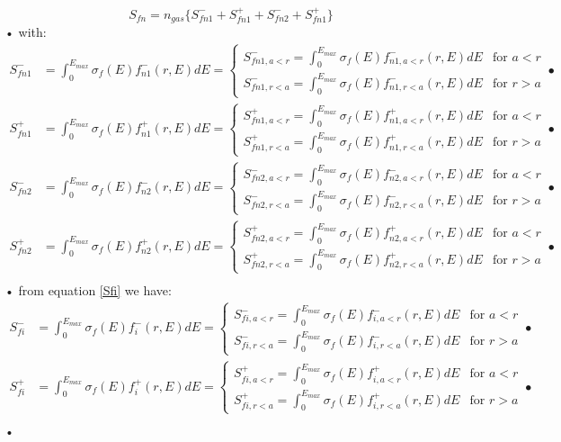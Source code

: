 \documentclass[a3]{book}
\begin{document}
\begin{equation}
 S_{fn} = n_{gas} \big\{ S_{fn1}^- + S_{fn1}^+ + S_{fn2}^- + S_{fn1}^+\big\}
\end{equation}•
with:
\begin{align}
 S_{fn1}^- 	& = \int_0^{E_{max}} \sigma_f(E) f_{n1}^-(r,E) dE =
	\begin{cases}
		S_{fn1,a<r}^- 	 = \int_0^{E_{max}} \sigma_f(E) f_{n1,a<r}^-(r,E) dE & \text{for } a < r  \\
		S_{fn1,r<a}^- 	 = \int_0^{E_{max}} \sigma_f(E) f_{n1,r<a}^-(r,E) dE & \text{for } r > a
	\end{cases}• \\
 S_{fn1}^+ 	& = \int_0^{E_{max}} \sigma_f(E) f_{n1}^+(r,E) dE = 
	\begin{cases}
		S_{fn1,a<r}^+ 	 = \int_0^{E_{max}} \sigma_f(E) f_{n1,a<r}^+(r,E) dE & \text{for } a < r  \\
		S_{fn1,r<a}^+ 	 = \int_0^{E_{max}} \sigma_f(E) f_{n1,r<a}^+(r,E) dE & \text{for } r > a
	\end{cases}• \\
 S_{fn2}^- 	& = \int_0^{E_{max}} \sigma_f(E) f_{n2}^-(r,E) dE  = 
	\begin{cases}
		S_{fn2,a<r}^- 	 = \int_0^{E_{max}} \sigma_f(E) f_{n2,a<r}^-(r,E) dE & \text{for } a < r  \\
		S_{fn2,r<a}^- 	 = \int_0^{E_{max}} \sigma_f(E) f_{n2,r<a}^-(r,E) dE & \text{for } r > a
	\end{cases}• \\
 S_{fn2}^+ 	& = \int_0^{E_{max}} \sigma_f(E) f_{n2}^+(r,E) dE =
	\begin{cases}
		S_{fn2,a<r}^+    = \int_0^{E_{max}} \sigma_f(E) f_{n2,a<r}^+(r,E) dE & \text{for } a < r  \\
		S_{fn2,r<a}^+ 	 = \int_0^{E_{max}} \sigma_f(E) f_{n2,r<a}^+(r,E) dE & \text{for } r > a
	\end{cases}• \\
\end{align}•
from equation \ref{Sfi} we have:
\begin{align}
 S_{fi}^- 		& = \int_0^{E_{max}} \sigma_f(E) f_{i}^-(r,E) dE  =
	\begin{cases}
		S_{fi,a<r}^- = \int_0^{E_{max}} \sigma_f(E) f_{i,a<r}^-(r,E) dE & \text{for } a < r  \\
		S_{fi,r<a}^- = \int_0^{E_{max}} \sigma_f(E) f_{i,r<a}^-(r,E) dE & \text{for } r > a
	\end{cases}• \\
 S_{fi}^+ 	& = \int_0^{E_{max}} \sigma_f(E) f_{i}^+(r,E) dE =
	\begin{cases}
		S_{fi,a<r}^+ = \int_0^{E_{max}} \sigma_f(E) f_{i,a<r}^+(r,E) dE & \text{for } a < r  \\
		S_{fi,r<a}^+ = \int_0^{E_{max}} \sigma_f(E) f_{i,r<a}^+(r,E) dE & \text{for } r > a
	\end{cases}• \\
\end{align}•
\end{document}

